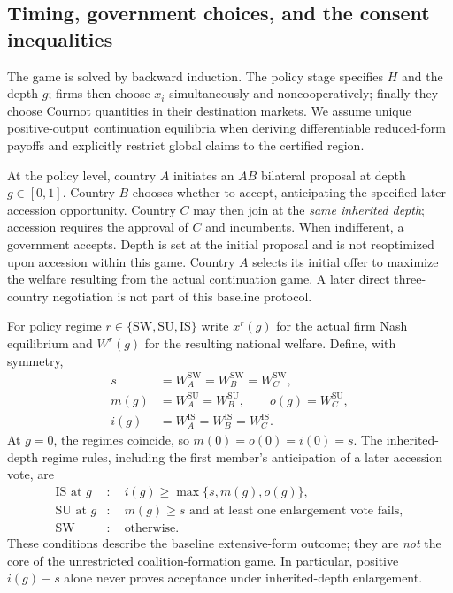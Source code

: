 \documentclass[11pt,a4paper]{article}
\theoremstyle{remark}\newtheorem{remark}[theorem]{Remark}
\newcommand{\SW}{\mathrm{SW}}\newcommand{\SU}{\mathrm{SU}}\newcommand{\IS}{\mathrm{IS}}
\begin{document}
\subsection{Timing, government choices, and the consent inequalities}
The game is solved by backward induction. The policy stage specifies $H$ and the depth $g$; firms then choose $x_i$ simultaneously and noncooperatively; finally they choose Cournot quantities in their destination markets. We assume unique positive-output continuation equilibria when deriving differentiable reduced-form payoffs and explicitly restrict global claims to the certified region.

At the policy level, country $A$ initiates an $AB$ bilateral proposal at depth $g\in[0,1]$. Country $B$ chooses whether to accept, anticipating the specified later accession opportunity. Country $C$ may then join at the \emph{same inherited depth}; accession requires the approval of $C$ and incumbents. When indifferent, a government accepts. Depth is set at the initial proposal and is not reoptimized upon accession within this game. Country $A$ selects its initial offer to maximize the welfare resulting from the actual continuation game. A later direct three-country negotiation is not part of this baseline protocol.

For policy regime $r\in\{\SW,\SU,\IS\}$ write $x^r(g)$ for the actual firm Nash equilibrium and $W^r(g)$ for the resulting national welfare. Define, with symmetry,
\begin{align}\label{eq:payoffs}
s&=W_A^{\SW}=W_B^{\SW}=W_C^{\SW},\nonumber\\
m(g)&=W_A^{\SU}=W_B^{\SU},\qquad o(g)=W_C^{\SU},\nonumber\\
i(g)&=W_A^{\IS}=W_B^{\IS}=W_C^{\IS}.
\end{align}
At $g=0$, the regimes coincide, so $m(0)=o(0)=i(0)=s$. The inherited-depth regime rules, including the first member's anticipation of a later accession vote, are
\begin{align}\label{eq:consent}
\IS\text{ at }g &: \quad i(g)\ge\max\{s,m(g),o(g)\},\\
\SU\text{ at }g &: \quad m(g)\ge s\text{ and at least one enlargement vote fails},\nonumber\\
\SW &: \quad\text{otherwise}.\nonumber
\end{align}
These conditions describe the baseline extensive-form outcome; they are \emph{not} the core of the unrestricted coalition-formation game. In particular, positive $i(g)-s$ alone never proves acceptance under inherited-depth enlargement.
\end{document}
